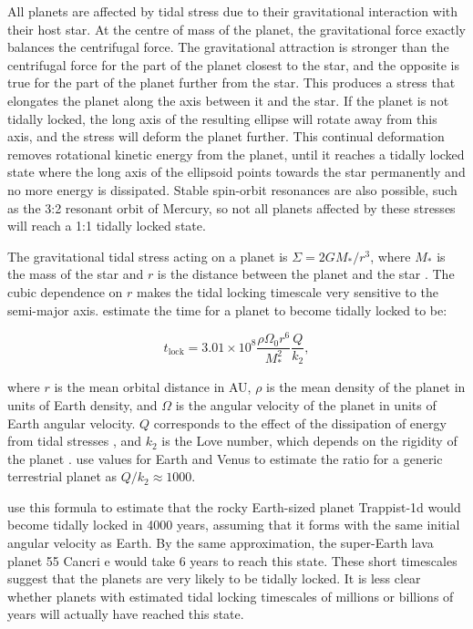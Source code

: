 All planets are affected by tidal stress due to their gravitational interaction with their host star. At the centre of mass of the planet, the gravitational force exactly balances the centrifugal force. The gravitational attraction is stronger than the centrifugal force for the part of the planet closest to the star, and the opposite is true for the part of the planet further from the star. This produces a stress that elongates the planet along the axis between it and the star. If the planet is not tidally locked, the long axis of the resulting ellipse will rotate away from this axis, and the stress will deform the planet further. This continual deformation removes rotational kinetic energy from the planet, until it reaches a tidally locked state where the long axis of the ellipsoid points towards the star permanently and no more energy is dissipated. Stable spin-orbit resonances are also possible, such as the 3:2 resonant orbit of Mercury, so not all planets affected by these stresses will reach a 1:1 tidally locked state.

The gravitational tidal stress acting on a planet is $\Sigma=2 G M_{*} / r^{3}$, where $M_{*}$ is the mass of the star and $r$ is the distance between the planet and the star \citep{pierrehumbert2018review}. The cubic dependence on $r$ makes the tidal locking timescale very sensitive to the semi-major axis. \citet{pierrehumbert2018review} estimate the time for a planet to become tidally locked to be:

\begin{equation}
  t_{\mathrm{lock}}=3.01 \times 10^{8} \frac{\rho \Omega_{0} r^{6}}{M_{*}^{2}} \frac{Q}{k_{2}},
\end{equation}

where $r$ is the mean orbital distance in AU, $\rho$ is the mean density of the planet in units of Earth density, and $\Omega$ is the angular velocity of the planet in units of Earth angular velocity. $Q$ corresponds to the effect of the dissipation of energy from tidal stresses \citep{goldreich1966q}, and $k_{2}$ is the Love number, which depends on the rigidity of the planet \citep{barnes2017tidal}. \citet{pierrehumbert2018review} use values for Earth and Venus to estimate the ratio for a generic terrestrial planet as $Q/k_{2} \approx 1000$.

 \citet{pierrehumbert2018review} use this formula to estimate that the rocky Earth-sized planet Trappist-1d would become tidally locked in 4000 years, assuming that it forms with the same initial angular velocity as Earth. By the same approximation, the super-Earth lava planet 55 Cancri e would take 6 years to reach this state. These short timescales suggest that the planets are very likely to be tidally locked. It is less clear whether planets with estimated tidal locking timescales of millions or billions of years will actually have reached this state.

